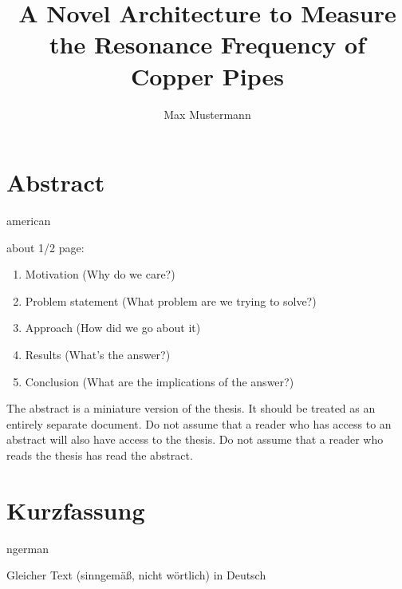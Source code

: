 \documentclass[]{nsm-thesis}
\author{Max Mustermann}
\title{A Novel Architecture to Measure the Resonance Frequency of Copper Pipes}
\begin{document}

\maketitle

\cleardoublepage


\chapter*{Abstract}
\begin{otherlanguage*}{american}

about 1/2 page:
\begin{enumerate}
    \item Motivation (Why do we care?)
    \item Problem statement (What problem are we trying to solve?)
    \item Approach (How did we go about it)
    \item Results (What's the answer?)
    \item Conclusion (What are the implications of the answer?)
\end{enumerate}

The abstract is a miniature version of the thesis.
It should be treated as an entirely separate document.
Do not assume that a reader who has access to an abstract will also have access to the thesis.
Do not assume that a reader who reads the thesis has read the abstract.

\end{otherlanguage*}


\chapter*{Kurzfassung}
\begin{otherlanguage*}{ngerman}

Gleicher Text (sinngemäß, nicht wörtlich) in Deutsch

\end{otherlanguage*}
\acresetall

\cleardoublepage
\tableofcontents
{}
\end{document}
